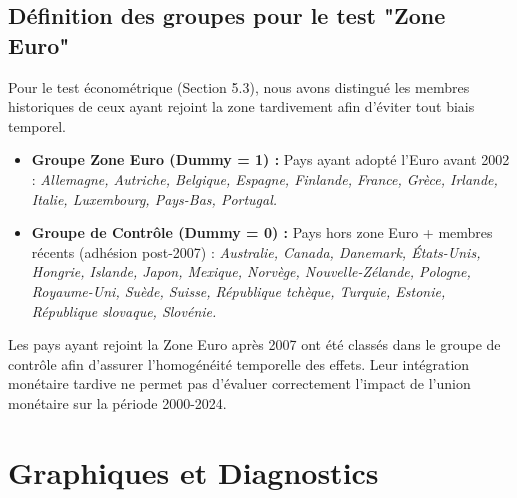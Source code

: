 \documentclass[12pt, a4paper]{article}
\begin{document}
\subsection{Définition des groupes pour le test "Zone Euro"}
Pour le test économétrique (Section 5.3), nous avons distingué les membres historiques de ceux ayant rejoint la zone tardivement afin d'éviter tout biais temporel.

\begin{itemize}
    \item \textbf{Groupe Zone Euro (Dummy = 1) :} 
    Pays ayant adopté l'Euro avant 2002 : \textit{Allemagne, Autriche, Belgique, Espagne, Finlande, France, Grèce, Irlande, Italie, Luxembourg, Pays-Bas, Portugal.}
    
    \item \textbf{Groupe de Contrôle (Dummy = 0) :} 
    Pays hors zone Euro + membres récents (adhésion post-2007) : \textit{Australie, Canada, Danemark, États-Unis, Hongrie, Islande, Japon, Mexique, Norvège, Nouvelle-Zélande, Pologne, Royaume-Uni, Suède, Suisse, République tchèque, Turquie, Estonie, République slovaque, Slovénie.}
\end{itemize}
\vspace{0.5cm}
Les pays ayant rejoint la Zone Euro après 2007 ont été classés dans le groupe de contrôle afin d’assurer l’homogénéité temporelle des effets. Leur intégration monétaire tardive ne permet pas d’évaluer correctement l’impact de l’union monétaire sur la période 2000-2024.

\newpage

\section{Graphiques et Diagnostics}
\label{annexe:graphiques}
\end{document}
